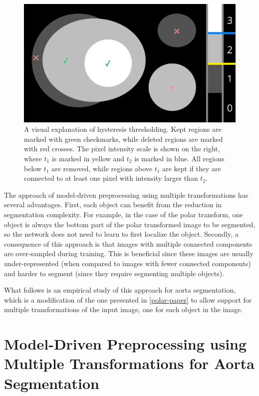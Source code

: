 		\begin{figure}[h]
		\centering
		\includegraphics[width=0.7\linewidth]{images/4/hysteresis-ccs}
		\caption{A visual explanation of hysteresis thresholding. Kept regions are marked with green checkmarks, while deleted regions are marked with red crosses. The pixel intensity scale is shown on the right, where $t_1$ is marked in yellow and $t_2$ is marked in blue. All regions below $t_1$ are removed, while regions above $t_1$ are kept if they are connected to at least one pixel with intensity larger than $t_2$.}
		\label{fig:hysteresis-ccs}
	\end{figure}
	
The approach of model-driven preprocessing using multiple transformations has several advantages. First, each object can benefit from the reduction in segmentation complexity. For example, in the case of the polar transform, one object is always the bottom part of the polar transformed image to be segmented, so the network does not need to learn to first localize the object. Secondly, a consequence of this approach is that images with multiple connected components are over-sampled during training. This is beneficial since these images are usually under-represented (when compared to images with fewer connected components) and harder to segment (since they require segmenting multiple objects).
	
What follows is an empirical study of this approach for aorta segmentation, which is a modification of the one presented in \ref{polar-paper} to allow support for multiple transformations of the input image, one for each object in the image.

\section{Model-Driven Preprocessing using Multiple Transformations for Aorta Segmentation}

